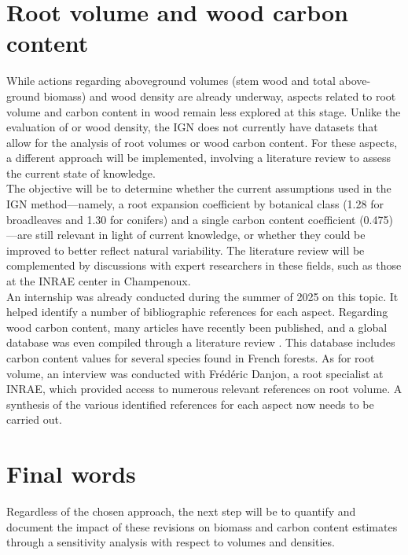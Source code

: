 \section{Root volume and wood carbon content}

While actions regarding aboveground volumes (stem wood and total above-ground biomass) and wood density are already underway, aspects related to root volume and carbon content in wood remain less explored at this stage. Unlike the evaluation of or wood density, the IGN does not currently have datasets that allow for the analysis of root volumes or wood carbon content. For these aspects, a different approach will be implemented, involving a literature review to assess the current state of knowledge. \\

The objective will be to determine whether the current assumptions used in the IGN method---namely, a root expansion coefficient by botanical class (1.28 for broadleaves and 1.30 for conifers) and a single carbon content coefficient (0.475)---are still relevant in light of current knowledge, or whether they could be improved to better reflect natural variability. The literature review will be complemented by discussions with expert researchers in these fields, such as those at the INRAE center in Champenoux. \\

An internship was already conducted during the summer of 2025 on this topic. It helped identify a number of bibliographic references for each aspect. Regarding wood carbon content, many articles have recently been published, and a global database was even compiled through a literature review \parencite{Doraisami2022}. This database includes carbon content values for several species found in French forests. As for root volume, an interview was conducted with Frédéric Danjon, a root specialist at INRAE, which provided access to numerous relevant references on root volume. A synthesis of the various identified references for each aspect now needs to be carried out.

\section{Final words}

Regardless of the chosen approach, the next step will be to quantify and document the impact of these revisions on biomass and carbon content estimates through a sensitivity analysis \parencite{Iooss2017} with respect to volumes and densities.

